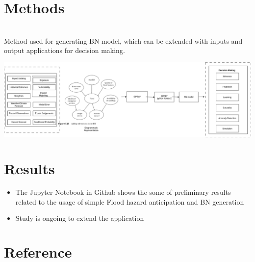 \documentclass[a0paper,fleqn]{betterposter}
\begin{document}
{\begin{itemize}
		\end{itemize}
		
		\section{Methods}
		\\ Method used for generating BN model, which can be extended with inputs and output applications for decision making.
		\begin{center}
			\includegraphics[width=\textwidth]{img/BN-model-IBF-v2.png}
		\end{center}
		
	    \section{Results}
		\begin{itemize}
			\item The Jupyter Notebook in Github shows the some of preliminary results related to the usage of simple Flood hazard anticipation and BN generation %
			\item Study is ongoing to extend the application
		\end{itemize}
		\section{Reference}
		\renewcommand{\bibsection}{}                                                                                                               
		
}
\end{document}
